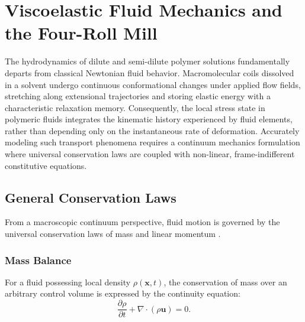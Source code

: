 \chapter{Viscoelastic Fluid Mechanics and the Four-Roll Mill}
\label{chap:fluidodynamic_background}

The hydrodynamics of dilute and semi-dilute polymer solutions fundamentally departs from classical Newtonian fluid behavior.
Macromolecular coils dissolved in a solvent undergo continuous conformational changes under applied flow fields,
stretching along extensional trajectories and storing elastic energy with a characteristic relaxation memory.
Consequently, the local stress state in polymeric fluids integrates the kinematic history
experienced by fluid elements, rather than depending only on the instantaneous rate of deformation.
Accurately modeling such transport phenomena requires a continuum mechanics formulation
where universal conservation laws are coupled with non-linear, frame-indifferent constitutive equations.


\section{General Conservation Laws}
\label{sec:general_conservation_laws}

From a macroscopic continuum perspective, fluid motion is governed by the universal conservation laws
of mass and linear momentum \cite{bird1987dynamics}.

\subsection{Mass Balance}
\label{subsec:general_mass}
For a fluid possessing local density $\rho(\boldsymbol{x}, t)$,
the conservation of mass over an arbitrary control volume is expressed by the continuity equation:
\begin{equation}
    \frac{\partial \rho}{\partial t} + \nabla \cdot (\rho \boldsymbol{u}) = 0 .
    \label{eq:general_mass}
\end{equation}

